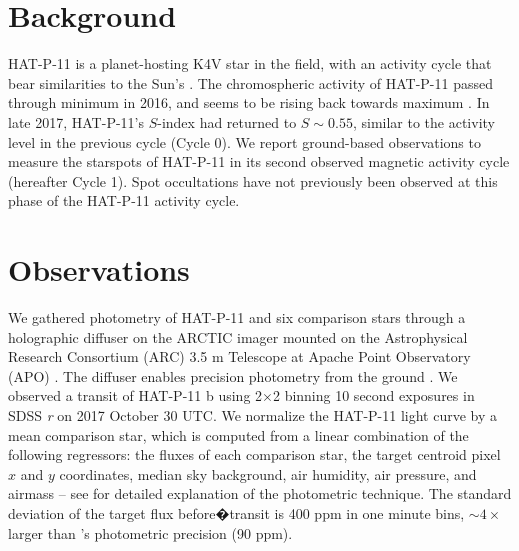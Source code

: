 

\newcommand{\sdssr}{SDSS \textsl{r}\xspace}

% 







\section{Background}
HAT-P-11 is a planet-hosting K4V star in the \kepler field, with an activity cycle that bear similarities to the Sun's \citep{bakos2010, Sanchis-Ojeda2011, Morris2017a}. The chromospheric activity of HAT-P-11 passed through minimum in 2016, and seems to be rising back towards maximum \citep{Morris2017b}. In late 2017, HAT-P-11's $S$-index had returned to $S\sim0.55$, similar to the activity level in the previous cycle (Cycle 0). We report ground-based observations to measure the starspots of HAT-P-11 in its second observed magnetic activity cycle (hereafter Cycle 1). Spot occultations have not previously been observed at this phase of the HAT-P-11 activity cycle.  

\section{Observations}

We gathered photometry of HAT-P-11 and six comparison stars through a holographic diffuser on the ARCTIC imager mounted on the Astrophysical Research Consortium (ARC) 3.5 m Telescope at Apache Point Observatory (APO) \citep{Huehnerhoff2016}. The diffuser enables precision photometry from the ground \citep{Stefansson2017}. We observed a transit of HAT-P-11 b using 2$\times$2 binning 10 second exposures in \sdssr on 2017 October 30 UTC. We normalize the HAT-P-11 light curve by a mean comparison star, which is computed from a linear combination of the following regressors: the fluxes of each comparison star, the target centroid pixel $x$ and $y$ coordinates, median sky background, air humidity, air pressure, and airmass -- see \citet{Morris2018a} for detailed explanation of the photometric technique. The standard deviation of the target flux before�transit is 400 ppm in one minute bins, $\sim4\times$ larger than \kepler's photometric precision (90 ppm).

